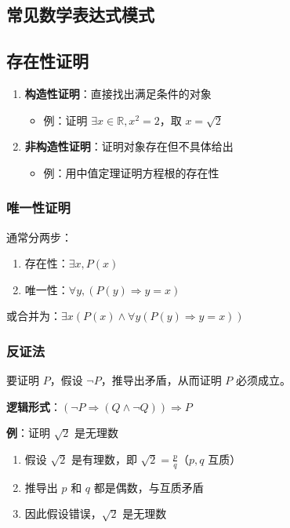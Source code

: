 \documentclass[12pt,a4paper,UTF8]{ctexart}
\begin{document}
\subsection{常见数学表达式模式}

\subsection{存在性证明}

\begin{enumerate}
    \item \textbf{构造性证明}：直接找出满足条件的对象
    \begin{itemize}
        \item 例：证明 $\exists x \in \mathbb{R}, x^2 = 2$，取 $x = \sqrt{2}$
    \end{itemize}
    \item \textbf{非构造性证明}：证明对象存在但不具体给出
    \begin{itemize}
        \item 例：用中值定理证明方程根的存在性
    \end{itemize}
\end{enumerate}

\subsubsection{唯一性证明}

通常分两步：
\begin{enumerate}
    \item 存在性：$\exists x, P(x)$
    \item 唯一性：$\forall y, (P(y) \Rightarrow y = x)$
\end{enumerate}

或合并为：$\exists x (P(x) \land \forall y (P(y) \Rightarrow y = x))$

\subsubsection{反证法}

要证明 $P$，假设 $\neg P$，推导出矛盾，从而证明 $P$ 必须成立。

\textbf{逻辑形式}：$(\neg P \Rightarrow (Q \land \neg Q)) \Rightarrow P$

\textbf{例}：证明 $\sqrt{2}$ 是无理数
\begin{enumerate}
    \item 假设 $\sqrt{2}$ 是有理数，即 $\sqrt{2} = \frac{p}{q}$（$p,q$ 互质）
    \item 推导出 $p$ 和 $q$ 都是偶数，与互质矛盾
    \item 因此假设错误，$\sqrt{2}$ 是无理数
\end{enumerate}
\end{document}
